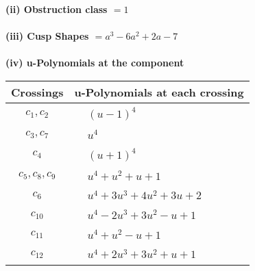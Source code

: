 \documentclass[1p]{elsarticle_modified}
\theoremstyle{definition}
\begin{document}
\flushleft \textbf{(ii) Obstruction class $= 1$}\\~\\
\flushleft \textbf{(iii) Cusp Shapes $= a^3-6 a^2+2 a-7$}\\~\\
\newpage\renewcommand{\arraystretch}{1}
\flushleft \textbf{(iv) u-Polynomials at the component}\newline \\
\begin{tabular}{m{50pt}|m{274pt}}
Crossings & \hspace{64pt}u-Polynomials at each crossing \\
\hline $$\begin{aligned}c_{1},c_{2}\end{aligned}$$&$\begin{aligned}
&(u-1)^4
\end{aligned}$\\
\hline $$\begin{aligned}c_{3},c_{7}\end{aligned}$$&$\begin{aligned}
&u^4
\end{aligned}$\\
\hline $$\begin{aligned}c_{4}\end{aligned}$$&$\begin{aligned}
&(u+1)^4
\end{aligned}$\\
\hline $$\begin{aligned}c_{5},c_{8},c_{9}\end{aligned}$$&$\begin{aligned}
&u^4+u^2+u+1
\end{aligned}$\\
\hline $$\begin{aligned}c_{6}\end{aligned}$$&$\begin{aligned}
&u^4+3 u^3+4 u^2+3 u+2
\end{aligned}$\\
\hline $$\begin{aligned}c_{10}\end{aligned}$$&$\begin{aligned}
&u^4-2 u^3+3 u^2- u+1
\end{aligned}$\\
\hline $$\begin{aligned}c_{11}\end{aligned}$$&$\begin{aligned}
&u^4+u^2- u+1
\end{aligned}$\\
\hline $$\begin{aligned}c_{12}\end{aligned}$$&$\begin{aligned}
&u^4+2 u^3+3 u^2+u+1
\end{aligned}$\\
\hline
\end{tabular}\\~\\
\end{document}
